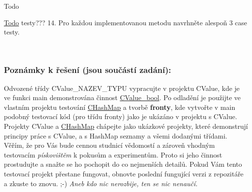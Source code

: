 \begin{DoxyRefDesc}{Todo}
\item[\hyperlink{todo__todo000004}{Todo}]testy??? 14. Pro každou implementovanou metodu navrhněte alespoň 3 case testy. \end{DoxyRefDesc}


~\newline
~\newline
\subsubsection*{Poznámky k řešení (jsou součástí zadání)\+:}

Odvozené třídy {\ttfamily C\+Value\+\_\+\+N\+A\+Z\+E\+V\+\_\+\+T\+Y\+PU} vypracujte v projektu C\+Value, kde je ve funkci {\ttfamily main} demonstrována činnost {\ttfamily \hyperlink{namespace_c_value__bool}{C\+Value\+\_\+bool}}. Po odladění je použijte ve vlastním projektu testování {\ttfamily \hyperlink{class_c_hash_map}{C\+Hash\+Map}} a tvorbě {\bfseries fronty}, kde vytvořte v {\ttfamily main} podobný testovací kód (pro třídu fronty) jako je ukázáno v projektu s C\+Value. Projekty C\+Value a \hyperlink{class_c_hash_map}{C\+Hash\+Map} chápejte jako ukázkové projekty, které demonstrují principy práce s C\+Value, a s Hash\+Map seznamy a všemi dodanými třídami. Věřím, že pro Vás bude cennou studnicí vědomostí a zároveň vhodným testovacím {\itshape pískovištěm} k pokusům a experimentům. Proto si jeho činnost prostudujte a snažte se ho pochopit do co nejmenších detailů. Pokud Vám tento testovací projekt přestane fungovat, obnovte poslední fungující verzi z repozitáře a zkuste to znovu. ;-\/) {\itshape Aneb kdo nic nerozbije, ten se nic nenaučí.}

